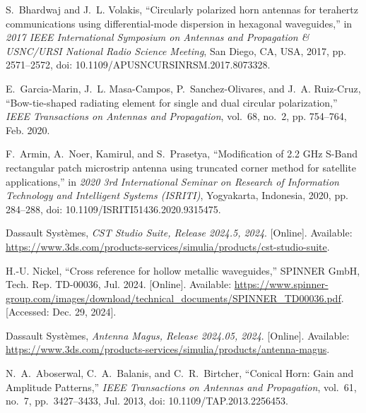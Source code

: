 \documentclass[journal,9pt]{IEEEtran}
\begin{document}
\begin{thebibliography}{99}
    S.~Bhardwaj and J.~L. Volakis, ``Circularly polarized horn antennas for terahertz communications using differential-mode dispersion in hexagonal waveguides,'' in \emph{2017 IEEE International Symposium on Antennas and Propagation \& USNC/URSI National Radio Science Meeting}, San Diego, CA, USA, 2017, pp. 2571--2572, doi: 10.1109/APUSNCURSINRSM.2017.8073328.

    E.~Garcia-Marin, J.~L. Masa-Campos, P.~Sanchez-Olivares, and J.~A. Ruiz-Cruz, ``Bow-tie-shaped radiating element for single and dual circular polarization,'' \emph{IEEE Transactions on Antennas and Propagation}, vol.~68, no.~2, pp. 754--764, Feb. 2020.

    F.~Armin, A.~Noer, Kamirul, and S.~Prasetya, ``Modification of 2.2 GHz S-Band rectangular patch microstrip antenna using truncated corner method for satellite applications,'' in \emph{2020 3rd International Seminar on Research of Information Technology and Intelligent Systems (ISRITI)}, Yogyakarta, Indonesia, 2020, pp. 284--288, doi: 10.1109/ISRITI51436.2020.9315475.

    Dassault Syst{\`e}mes, \emph{CST Studio Suite, Release 2024.5, 2024}. [Online]. Available: \url{https://www.3ds.com/products-services/simulia/products/cst-studio-suite}.

    H.-U. Nickel, ``Cross reference for hollow metallic waveguides,'' SPINNER GmbH, Tech. Rep. TD-00036, Jul. 2024. [Online]. Available: \url{https://www.spinner-group.com/images/download/technical_documents/SPINNER_TD00036.pdf}. [Accessed: Dec. 29, 2024].

    Dassault Syst{\`e}mes, \emph{Antenna Magus, Release 2024.05, 2024}. [Online]. Available: \url{https://www.3ds.com/products-services/simulia/products/antenna-magus}.

    N.~A.~Aboserwal, C.~A.~Balanis, and C.~R.~Birtcher, ``Conical Horn: Gain and Amplitude Patterns,'' \emph{IEEE Transactions on Antennas and Propagation}, vol.~61, no.~7, pp.~3427--3433, Jul. 2013, doi: 10.1109/TAP.2013.2256453.


\end{thebibliography}
\end{document}
